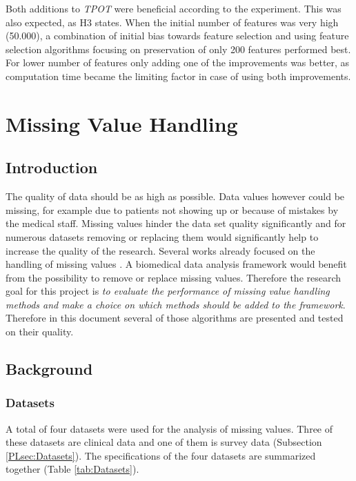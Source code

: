 \documentclass[10pt,a4paper]{report}
\begin{document}
	Both additions to \textit{TPOT} were beneficial according to the experiment. This was also expected, as H3 states.  When the initial number of features was very high (50.000), a combination of initial bias towards feature selection and using feature selection algorithms focusing on preservation of only 200 features performed best. For lower number of features only adding one of the improvements was better, as computation time became the limiting factor in case of using both improvements.

	\chapter{Missing Value Handling}
	\label{chap:MissingValueHandling}
	
	\section{Introduction}
	\label{MVsec:Introduction}
	
	The quality of data should be as high as possible. Data values however could be missing, for example due to patients not showing up or because of mistakes by the medical staff. Missing values hinder the data set quality significantly and for numerous datasets removing or replacing them would significantly help to increase the quality of the research. Several works already focused on the handling of missing values \cite{donders2006gentle, cartwright2003dealing, haukoos2007advanced}. A biomedical data analysis framework would benefit from the possibility to remove or replace missing values. Therefore the research goal for this project is \emph{to evaluate the performance of missing value handling methods and make a choice on which methods should be added to the framework}. Therefore in this document several of those algorithms are presented and tested on their quality.
	
	\section{Background}
	\label{sec:Background}
	
	\subsection{Datasets}
	\label{MVsubsec:Datasets}
	
	A total of four datasets were used for the analysis of missing values. Three of these datasets are clinical data and one of them is survey data (Subsection \ref{PLsec:Datasets}). The specifications of the four datasets are summarized together (Table \ref{tab:Datasets}).
	
\end{document}
